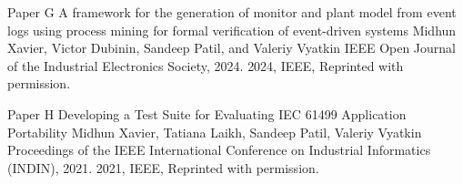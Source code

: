 \documentclass[12pt,a4paper,openright,final,twoside]{cseethesis}
\begin{document}

\makepaperaccepted
  {\paperheader}
  {\papertitle}
  {\paperauthorstring}
  {}
  {\copyrightstring}



\def\paperheader{Paper G}
\def\papertitle{A framework for the generation of monitor and plant model from event logs using process mining for formal verification of event-driven systems}
\def\paperauthorstring{Midhun Xavier, Victor Dubinin, Sandeep Patil, and Valeriy Vyatkin}
\def\referencestring{IEEE Open Journal of the Industrial Electronics Society, 2024.}
\def\copyrightstring{2024, IEEE, Reprinted with permission.}


\makepaperaccepted
  {\paperheader}
  {\papertitle}
  {\paperauthorstring}
  {\referencestring}
  {\copyrightstring}



\def\paperheader{Paper H}
\def\papertitle{Developing a Test Suite for Evaluating IEC 61499 Application Portability}
\def\paperauthorstring{Midhun Xavier, Tatiana Laikh, Sandeep Patil, Valeriy Vyatkin}
\def\referencestring{Proceedings of the IEEE International Conference on Industrial Informatics (INDIN), 2021.}
\def\copyrightstring{2021, IEEE, Reprinted with permission.}


\makepaperaccepted
  {\paperheader}
  {\papertitle}
  {\paperauthorstring}
  {\referencestring}
  {\copyrightstring}


\end{document}
